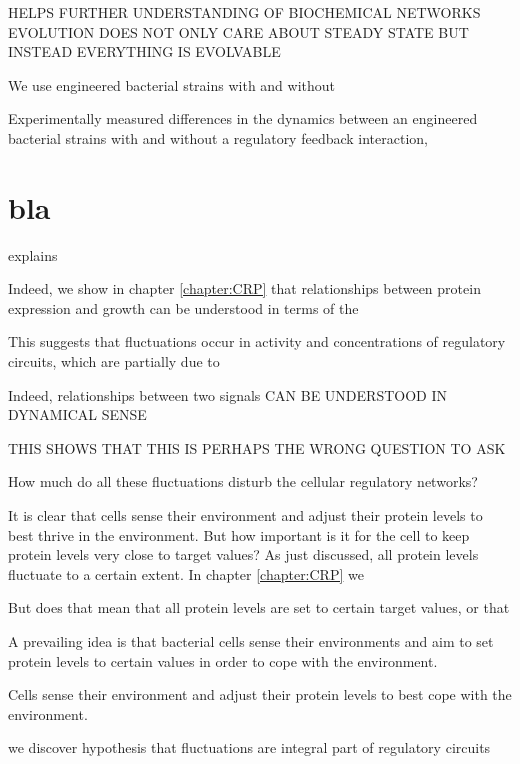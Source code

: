 
HELPS FURTHER UNDERSTANDING OF BIOCHEMICAL NETWORKS 
EVOLUTION DOES NOT ONLY CARE ABOUT STEADY STATE BUT INSTEAD EVERYTHING IS EVOLVABLE

We use engineered bacterial strains with and without 

Experimentally measured differences in the dynamics between an engineered bacterial strains with and without a regulatory feedback interaction,

\clearpage
\section{bla}

explains 

Indeed, we show in chapter \ref{chapter:CRP} that relationships between protein expression and growth can be understood in terms of the 





This suggests that fluctuations occur in activity and concentrations of regulatory circuits, 
which are partially due to 

Indeed, relationships between two signals CAN BE UNDERSTOOD IN DYNAMICAL SENSE






THIS SHOWS THAT THIS IS PERHAPS THE WRONG QUESTION TO ASK


How much do all these fluctuations disturb the cellular regulatory networks?
%


It is clear that cells sense their environment and adjust their protein levels to best thrive in the environment.
%
But how important is it for the cell to keep protein levels very close to target values?
%
As just discussed, all protein levels fluctuate to a certain extent.
%
In chapter \ref{chapter:CRP} we 




But does that mean that all protein levels are set to certain target values, or that 



A prevailing idea is that bacterial cells sense their environments and aim to set protein levels to certain values in order to cope with the environment.
%



Cells sense their environment and adjust their protein levels to best cope with the environment.
%


we discover hypothesis that fluctuations are integral part of regulatory circuits

